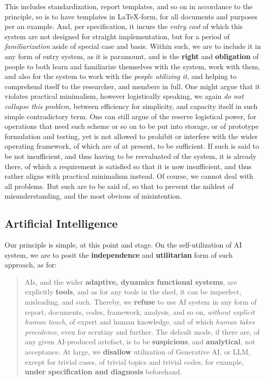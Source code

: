 \documentclass[10pt,a4paper]{article}
\begin{document}
This includes standardization, report templates, and so on in accordance to the principle, so is to have templates in \LaTeX-form, for all documents and purposes per an example. And, per specification, it incurs the \textit{entry cost} of which this system are not designed for straight implementation, but for a period of \textit{familiarization} aside of special case and basis. Within such, we are to include it in any form of entry system, as it is paramount, and is the \textbf{right} and \textbf{obligation} of people to both learn and familiarize themselves with the system, work with them, and also for the system to work with the \textit{people utilizing it}, and helping to comprehend itself to the researcher, and members in full. One might argue that it violates practical minimalism, however logistically speaking, we again \textit{do not collapse this problem}, between efficiency for simplicity, and capacity itself in such simple contradictory term. One can still argue of the reserve logistical power, for operations that need such scheme or so on to be put into storage, or of prototype formulation and testing, yet is not allowed to prohibit or interfere with the wider operating framework, of which are of at present, to be sufficient. If such is said to be not insufficient, and thus having to be reevaluated of the system, it is already there, of which a requirement is satisfied so that it is now insufficient, and thus rather aligns with practical minimalism instead. Of course, we cannot deal with all problems. But such are to be said of, so that to prevent the mildest of misunderstanding, and the most obvious of misintention. 

\subsection{Artificial Intelligence}

Our principle is simple, at this point and stage. On the self-utilization of AI system, we are to posit the \textbf{independence} and \textbf{utilitarian} form of such approach, as for:
\begin{quote}
    AIs, and the wider \textbf{adaptive, dynamics functional systems}, are explicitly \textbf{tools}, and as for any tools in the shed, it can be imperfect, misleading, and such. Thereby, we \textbf{refuse} to use AI system in any form of report, documents, codes, framework, analysis, and so on, \textit{without explicit human touch}, of expert and human knowledge, and of which \textit{human takes precedence}, even for scrutiny and further. The default mode, if there are, of any given AI-produced artefact, is to be \textbf{suspicious}, and \textbf{analytical}, not acceptance. At large, we \textbf{disallow} utilization of Generative AI, or LLM, except for trivial cases, of trivial topics and trivial codes, for example, \textbf{under specification and diagnosis} beforehand. 
\end{quote}
\end{document}
